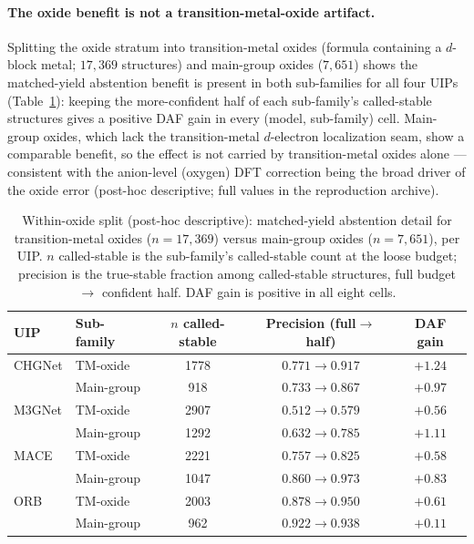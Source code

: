 \documentclass[11pt]{article}
\begin{document}
\paragraph{The oxide benefit is not a transition-metal-oxide artifact.} Splitting the oxide
stratum into transition-metal oxides (formula containing a $d$-block metal; $17{,}369$ structures)
and main-group oxides ($7{,}651$) shows the matched-yield abstention benefit is present in
both sub-families for all four UIPs (Table~\ref{tab:tmoxide}): keeping the more-confident
half of each sub-family's called-stable structures gives a positive DAF gain in every
(model, sub-family) cell. Main-group oxides, which lack the transition-metal $d$-electron
localization seam, show a comparable benefit, so the effect is not carried by transition-metal
oxides alone --- consistent with the anion-level (oxygen) DFT correction being the broad driver of
the oxide error (post-hoc descriptive; full values in the reproduction archive).

\begin{table}[t]
  \centering
  \caption{Within-oxide split (post-hoc descriptive): matched-yield abstention detail for
  transition-metal oxides ($n=17{,}369$) versus main-group oxides ($n=7{,}651$), per UIP.
  $n$ called-stable is the sub-family's called-stable count at the loose budget; precision is
  the true-stable fraction among called-stable structures, full budget $\to$ confident half.
  DAF gain is positive in all eight cells.}
  \label{tab:tmoxide}
  \begin{tabular}{llccc}
    \toprule
    UIP & Sub-family & $n$ called-stable & Precision (full$\to$half) & DAF gain \\
    \midrule
    CHGNet & TM-oxide    & 1778 & $0.771\to0.917$ & $+1.24$ \\
           & Main-group  & 918  & $0.733\to0.867$ & $+0.97$ \\
    M3GNet & TM-oxide    & 2907 & $0.512\to0.579$ & $+0.56$ \\
           & Main-group  & 1292 & $0.632\to0.785$ & $+1.11$ \\
    MACE   & TM-oxide    & 2221 & $0.757\to0.825$ & $+0.58$ \\
           & Main-group  & 1047 & $0.860\to0.973$ & $+0.83$ \\
    ORB    & TM-oxide    & 2003 & $0.878\to0.950$ & $+0.61$ \\
           & Main-group  & 962  & $0.922\to0.938$ & $+0.11$ \\
    \bottomrule
  \end{tabular}
\end{table}
\end{document}
